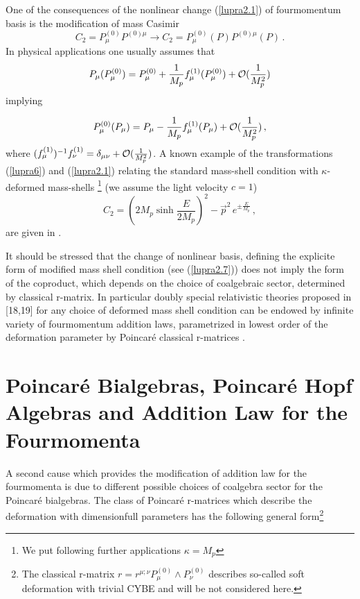\documentclass[a4paper,a4paper]{article}
\begin{document}
One of the consequences of the nonlinear change (\ref{lupra2.1})
of fourmomentum basis is the modification of mass Casimir
\begin{equation}\label{lupra2.7}
  C_2 = P^{(0)}_\mu P^{(0)\mu} \to C_2  = P^{(0)}_\mu (P)
  P^{(0)\mu}(P)\, .
\end{equation}
In physical applications one usually assumes that
\begin{equation}\label{lupra2.8}
  P_\mu  (P^{(0)}_\mu) = P^{(0)}_\mu + \frac{1}{M_p} f^{(1)}_\mu
  (P^{(0)}_\mu)  + {\cal O} ( \frac{1}{M_{p}^2})
\end{equation}
implying

\begin{equation}\label{lupra2.9}
  P^{(0)}_\mu  (P_\mu) = P_\mu - \frac{1}{M_p} f^{(1)}_\mu
  (P_\mu)  + {\cal O} ( \frac{1}{M_{p}^2})\, ,
\end{equation}
where $(f^{(1)}_\mu)^{-1} f^{(1)}_\nu = \delta_{\mu\nu} +{\cal O}
( \frac{1}{M_{p}^2})$. A known example of the transformations
(\ref{lupra6}) and (\ref{lupra2.1}) relating the standard
mass-shell condition with $\kappa$-deformed mass-shells
\cite{lrz}\footnote{We  put following further applications $\kappa
= M_p$} (we assume the light velocity $c=1$)
\begin{equation}\label{lupra2.10}
  C_2 = \left(  2M_p \sinh  \frac{E}{2M_p}\right)^2 -
  \overrightarrow{p}^2 \, e^{\pm \frac{E}{M_p}}\, ,
\end{equation}
are given in \cite{klms}.

It should be stressed that the change of nonlinear  basis,
defining the explicite form of modified mass shell condition (see
(\ref{lupra2.7})) does not imply the form of the  coproduct, which
depends on the choice of coalgebraic sector, determined by
classical r-matrix. In particular doubly   special relativistic
theories proposed in  [18,19] for any choice of deformed mass
shell condition  can be endowed by infinite variety of
fourmomentum addition laws, parametrized in lowest order  of the
deformation parameter by Poincar\'{e} classical r-matrices
\cite{zak}.

\section{Poincar\'{e} Bialgebras, Poincar\'{e} Hopf Algebras and
Addition Law for the Fourmomenta}

\setcounter{equation}{0}

A second cause which provides the modification of addition law for
the fourmomenta is due to different possible choices of coalgebra
sector for the Poincar\'{e} bialgebras. The class of Poincar\'{e}
r-matrices which describe the deformation with dimensionfull
parameters has the following general form\footnote{The classical
r-matrix $r=r^{\mu;\nu} P^{(0)}_\mu \wedge P^{(0)}_\nu$ describes
so-called soft deformation \cite{zak2} with   trivial CYBE and
will be not considered here.}
\end{document}
